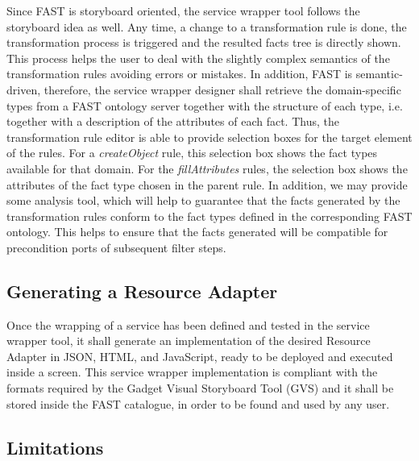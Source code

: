 \documentclass{fast_latex}
\begin{document}
Since FAST is storyboard oriented, the service wrapper tool follows the storyboard idea as well. Any time, a change to a transformation rule is done, the transformation process is triggered and the resulted facts tree is directly shown. This process helps the user to deal with the slightly complex semantics of the transformation rules avoiding errors or mistakes. In addition, FAST is semantic-driven, therefore, the service wrapper designer shall retrieve the domain-specific types from a FAST ontology server together with the structure of each type, i.e. together with a description of the attributes of each fact. Thus, the transformation rule editor is able to provide selection boxes for the target element of the rules. For a \emph{createObject} rule, this selection box shows the fact types available for that domain. For the \emph{fillAttributes} rules, the selection box shows the attributes of the fact type chosen in the parent rule. In addition, we may provide some analysis tool, which will help to guarantee that the facts generated by the transformation rules conform to the fact types defined in the corresponding FAST ontology. This helps to ensure that the facts generated will be compatible for precondition ports of subsequent filter steps.



\subsection{Generating a Resource Adapter} %
\label{sub:generating_a_resource_adapter}

Once the wrapping of a service has been defined and tested in the service wrapper tool, it shall generate an implementation of the desired Resource Adapter in JSON, HTML, and JavaScript, ready to be deployed and executed inside a screen. This service wrapper implementation is compliant with the formats required by the Gadget Visual Storyboard Tool (GVS) and it shall be stored inside the FAST catalogue, in order to be found and used by any user.


\subsection{Limitations} %
\label{sub:limitations}
\end{document}
